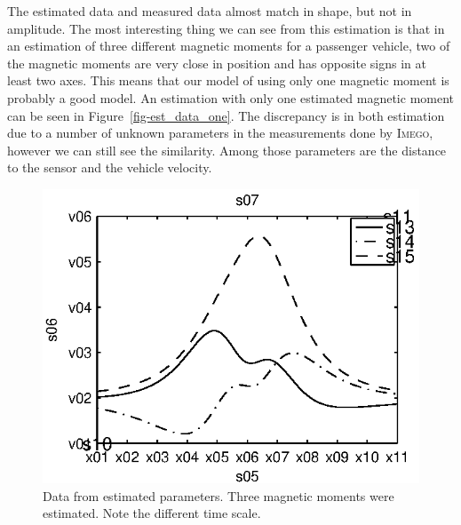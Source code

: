 The estimated data and measured data almost match in shape, but not in amplitude. The most interesting thing we can see from this estimation is that in an estimation of three different magnetic moments for a passenger vehicle, two of the magnetic moments are very close in position and has opposite signs in at least two axes. This means that our model of using only one magnetic moment is probably a good model. An estimation with only one estimated magnetic moment can be seen in Figure~\ref{fig-est_data_one}. The discrepancy is in both estimation due to a number of unknown parameters in the measurements done by \textsc{Imego}, however we can still see the similarity. Among those parameters are the distance to the sensor and the vehicle velocity.

\begin{subfigures}
\begin{figure}[!htbf]
  \centering
  \begin{minipage}{0.45\linewidth}
  \centering
   
   \includegraphics[width=\linewidth]{images/meas_data_three}
  \caption[Data from estimated parameters, three magnetic moments]{Data from estimated parameters. Three magnetic moments were estimated. Note the different time scale.}
  \label{fig-leastsqdata}
  \end{minipage}\hfill
  \begin{minipage}{0.45\linewidth}
   \centering
     

\end{minipage}
\end{figure}
\end{subfigures}
